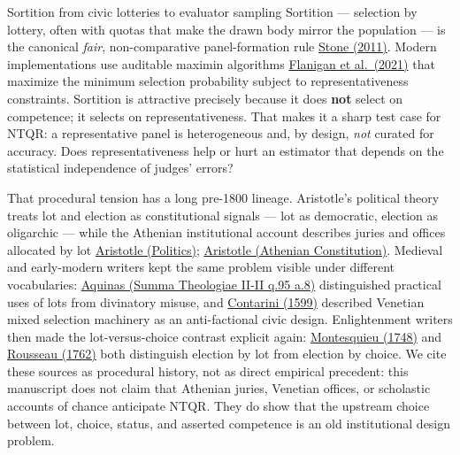 \documentclass[
  ignorenonframetext,
]{beamer}
\begin{document}
\begin{frame}[allowframebreaks]{Sortition from civic lotteries to
evaluator sampling}
\protect{}\label{sortition-from-civic-lotteries-to-evaluator-sampling}
Sortition --- selection by lottery, often with quotas that make the
drawn body mirror the population --- is the canonical \emph{fair},
non-comparative panel-formation rule
\href{https://doi.org/10.1093/acprof:oso/9780199756100.001.0001}{Stone
(2011)}. Modern implementations use auditable maximin algorithms
\href{https://doi.org/10.1038/s41586-021-03788-6}{Flanigan et
al.~(2021)} that maximize the minimum selection probability subject to
representativeness constraints. Sortition is attractive precisely
because it does \textbf{not} select on competence; it selects on
representativeness. That makes it a sharp test case for NTQR: a
representative panel is heterogeneous and, by design, \emph{not} curated
for accuracy. Does representativeness help or hurt an estimator that
depends on the statistical independence of judges' errors?

That procedural tension has a long pre-1800 lineage. Aristotle's
political theory treats lot and election as constitutional signals ---
lot as democratic, election as oligarchic --- while the Athenian
institutional account describes juries and offices allocated by lot
\href{https://topostext.org/work/100}{Aristotle (Politics)};
\href{https://topostext.org/work/99}{Aristotle (Athenian Constitution)}.
Medieval and early-modern writers kept the same problem visible under
different vocabularies:
\href{https://www.newadvent.org/summa/3095.htm\#article8}{Aquinas (Summa
Theologiae II-II q.95 a.8)} distinguished practical uses of lots from
divinatory misuse, and
\href{https://onlinebooks.library.upenn.edu/webbin/book/lookupid?key=olbp14764}{Contarini
(1599)} described Venetian mixed selection machinery as an
anti-factional civic design. Enlightenment writers then made the
lot-versus-choice contrast explicit again:
\href{https://oll.libertyfund.org/titles/montesquieu-complete-works-vol-1-the-spirit-of-laws}{Montesquieu
(1748)} and
\href{https://oll.libertyfund.org/titles/cole-the-social-contract-and-discourses}{Rousseau
(1762)} both distinguish election by lot from election by choice. We
cite these sources as procedural history, not as direct empirical
precedent: this manuscript does not claim that Athenian juries, Venetian
offices, or scholastic accounts of chance anticipate NTQR. They do show
that the upstream choice between lot, choice, status, and asserted
competence is an old institutional design problem.


\end{frame}
\end{document}
